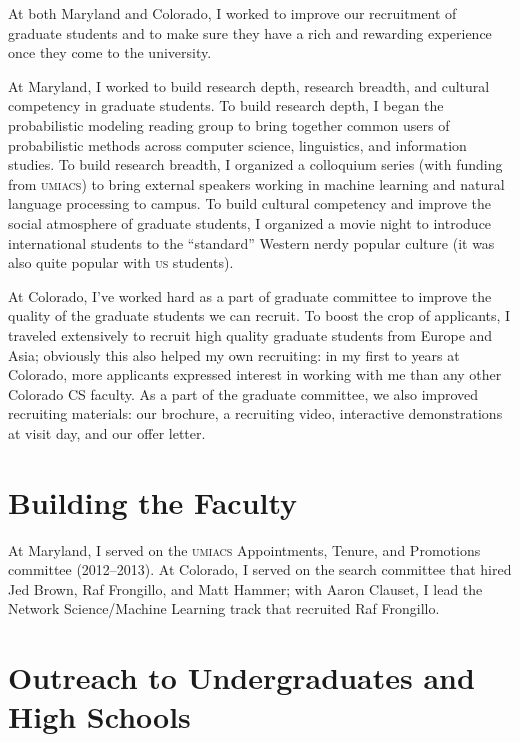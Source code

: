 \documentclass[11pt]{amsart}
\newcommand{\abr}[1]{\textsc{#1}}
\begin{document}


At both Maryland and Colorado, I worked to improve our recruitment of graduate
students and to make sure they have a rich and rewarding experience once they
come to the university.

At Maryland, I worked to build research depth, research breadth, and cultural
competency in graduate students.  To build research depth, I began the
probabilistic modeling reading group to bring together common users of
probabilistic methods across computer science, linguistics, and information
studies.  To build research breadth, I organized a colloquium series (with
funding from \abr{umiacs}) to bring external speakers working in machine
learning and natural language processing to campus.  To build cultural
competency and improve the social atmosphere of graduate students, I organized a
movie night to introduce international students to the ``standard'' Western
nerdy popular culture (it was also quite popular with \abr{us} students).

At Colorado, I've worked hard as a part of graduate committee to improve the
quality of the graduate students we can recruit.  To boost the crop of
applicants, I traveled extensively to recruit high quality graduate students
from Europe and Asia; obviously this also helped my own recruiting: in my first
to years at Colorado, more applicants expressed interest in working with me than
any other Colorado CS faculty.  As a part of the graduate committee, we
also improved recruiting materials: our brochure, a recruiting video,
interactive demonstrations at visit day, and our offer letter.

\section{Building the Faculty}

At Maryland, I served on the \abr{umiacs} Appointments, Tenure, and Promotions
committee (2012--2013).  At Colorado, I served on the search committee that
hired Jed Brown, Raf Frongillo, and Matt Hammer; with Aaron Clauset, I lead the
Network Science/Machine Learning track that recruited Raf Frongillo.


\section{Outreach to Undergraduates and High Schools}

\end{document}
